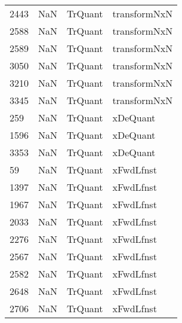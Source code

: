 \begin{tabular}{llll}
2443 &                   NaN &                    TrQuant &                              transformNxN \\
2588 &                   NaN &                    TrQuant &                              transformNxN \\
2589 &                   NaN &                    TrQuant &                              transformNxN \\
3050 &                   NaN &                    TrQuant &                              transformNxN \\
3210 &                   NaN &                    TrQuant &                              transformNxN \\
3345 &                   NaN &                    TrQuant &                              transformNxN \\
259  &                   NaN &                    TrQuant &                                  xDeQuant \\
1596 &                   NaN &                    TrQuant &                                  xDeQuant \\
3353 &                   NaN &                    TrQuant &                                  xDeQuant \\
59   &                   NaN &                    TrQuant &                                 xFwdLfnst \\
1397 &                   NaN &                    TrQuant &                                 xFwdLfnst \\
1967 &                   NaN &                    TrQuant &                                 xFwdLfnst \\
2033 &                   NaN &                    TrQuant &                                 xFwdLfnst \\
2276 &                   NaN &                    TrQuant &                                 xFwdLfnst \\
2567 &                   NaN &                    TrQuant &                                 xFwdLfnst \\
2582 &                   NaN &                    TrQuant &                                 xFwdLfnst \\
2648 &                   NaN &                    TrQuant &                                 xFwdLfnst \\
2706 &                   NaN &                    TrQuant &                                 xFwdLfnst \\

\end{tabular}
